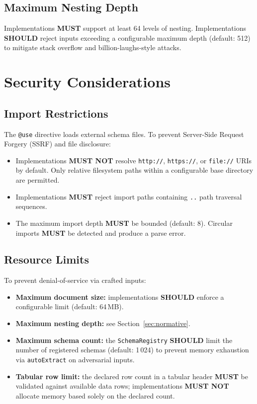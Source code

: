 \documentclass[11pt, a4paper]{article}
\begin{document}
\subsection{Maximum Nesting Depth}

Implementations \textbf{MUST} support at least 64 levels of nesting.
Implementations \textbf{SHOULD} reject inputs exceeding a configurable
maximum depth (default: 512) to mitigate stack overflow and
billion-laughs-style attacks.

\section{Security Considerations}
\label{sec:security}

\subsection{Import Restrictions}

The \texttt{@use} directive loads external schema files. To prevent
Server-Side Request Forgery (SSRF) and file disclosure:

\begin{itemize}
\item Implementations \textbf{MUST NOT} resolve \texttt{http://},
      \texttt{https://}, or \texttt{file://} URIs by default.
      Only relative filesystem paths within a configurable base
      directory are permitted.
\item Implementations \textbf{MUST} reject import paths containing
      \texttt{..} path traversal sequences.
\item The maximum import depth \textbf{MUST} be bounded (default: 8).
      Circular imports \textbf{MUST} be detected and produce a
      parse error.
\end{itemize}

\subsection{Resource Limits}

To prevent denial-of-service via crafted inputs:

\begin{itemize}
\item \textbf{Maximum document size:} implementations \textbf{SHOULD}
      enforce a configurable limit (default: 64\,MB).
\item \textbf{Maximum nesting depth:} see Section~\ref{sec:normative}.
\item \textbf{Maximum schema count:} the \texttt{SchemaRegistry}
      \textbf{SHOULD} limit the number of registered schemas
      (default: 1\,024) to prevent memory exhaustion via
      \texttt{autoExtract} on adversarial inputs.
\item \textbf{Tabular row limit:} the declared row count in a
      tabular header \textbf{MUST} be validated against available
      data rows; implementations \textbf{MUST NOT} allocate memory
      based solely on the declared count.
\end{itemize}
\end{document}
